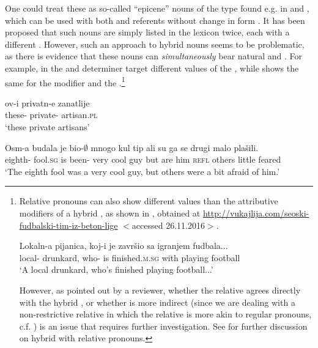 \documentclass[output=paper,modfonts,newtxmath,hidelinks]{langscibook}
\begin{document}
\noindent One could treat these as so-called ``epicene'' nouns of the type found e.g. in  and , which can be used with both  and  referents without change in form \citep{bobaljikzocca,merchant14,kramerbook}.
 It has been proposed that such nouns are simply listed in the lexicon twice, each with a different  \citep[e.g.][19]{merchant14}. However, such an approach to  hybrid nouns seems to be problematic, as there is evidence that these nouns can \textit{simultaneously} bear natural and . 
 For example, in  the  and determiner target different  values of the , while  shows the same for the  modifier and the .\footnote{Relative pronouns can also show different  values than the attributive modifiers of a hybrid , as shown in , obtained at \url{http://vukajlija.com/seoski-fudbalski-tim-iz-beton-lige} $<$accessed 26.11.2016$>$.
 
\ea \gll Lokaln-a pijanica, koj-i je završio sa igranjem fudbala...\\
	local- drunkard, who- is finished.\textsc{m.sg} with playing football\\
	\glt `A local drunkard, who's finished playing football...'\label{14:exfn1i}
    \z

\noindent However, as pointed out by a reviewer, whether the relative  agrees directly with the hybrid , or whether  is more indirect (since we are dealing with a non-restrictive relative  in which the relative  is more akin to regular pronouns, c.f. \citealt{devries06}) is an issue that requires further investigation. See \citet{arsenijevicjuksek} for further discussion on hybrid  with relative pronouns.}	

	\ea \gll ov-i privatn-e zanatlije\label{14:mismatchbcs}\\
	these- private- artisan.\textsc{pl}\\
	\glt `these private artisans'\hfill \citep[206]{corbett06}\label{14:ex3}
    \z
	
	\ea \gll Osm-a budala je bio-$\emptyset$ mnogo kul tip ali su ga se drugi malo plašili.\footnotemark\\
	eighth- fool.\textsc{sg} is been- very cool guy but are him \textsc{refl} others little feared\\
	\glt `The eighth fool was a very cool guy, but others were a bit afraid of him.'\label{14:ex4}
    \z
 
\end{document}
